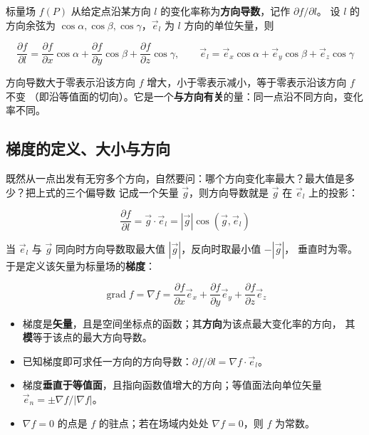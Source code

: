 标量场 $f(P)$ 从给定点沿某方向 $l$ 的变化率称为\textbf{方向导数}，记作 $\partial f/\partial l$。
设 $l$ 的方向余弦为 $\cos\alpha,\cos\beta,\cos\gamma$，$\vec{e}_l$ 为 $l$ 方向的单位矢量，则
\begin{formulaBox}
\[
\frac{\partial f}{\partial l}=\frac{\partial f}{\partial x}\cos\alpha
+\frac{\partial f}{\partial y}\cos\beta
+\frac{\partial f}{\partial z}\cos\gamma,
\qquad
\vec{e}_l=\vec{e}_x\cos\alpha+\vec{e}_y\cos\beta+\vec{e}_z\cos\gamma
\]
\end{formulaBox}

方向导数大于零表示沿该方向 $f$ 增大，小于零表示减小，等于零表示沿该方向 $f$ 不变
（即沿等值面的切向）。它是一个\textbf{与方向有关}的量：同一点沿不同方向，变化率不同。

\subsection{梯度的定义、大小与方向}

既然从一点出发有无穷多个方向，自然要问：哪个方向变化率最大？最大值是多少？把上式的三个偏导数
记成一个矢量 $\vec{g}$，则方向导数就是 $\vec{g}$ 在 $\vec{e}_l$ 上的投影：
\begin{formulaBox}
\[
\frac{\partial f}{\partial l}=\vec{g}\cdot\vec{e}_l=|\vec{g}|\cos(\vec{g},\vec{e}_l)
\]
\end{formulaBox}

当 $\vec{e}_l$ 与 $\vec{g}$ 同向时方向导数取最大值 $|\vec{g}|$，反向时取最小值 $-|\vec{g}|$，
垂直时为零。于是定义该矢量为标量场的\textbf{梯度}：
\begin{formulaBox}
\[
\operatorname{grad} f=\nabla f
=\frac{\partial f}{\partial x}\vec{e}_x+\frac{\partial f}{\partial y}\vec{e}_y+\frac{\partial f}{\partial z}\vec{e}_z
\]
\end{formulaBox}

\begin{itemize}
    \item 梯度是\textbf{矢量}，且是空间坐标点的函数；其\textbf{方向}为该点最大变化率的方向，
    其\textbf{模}等于该点的最大方向导数。
    \item 已知梯度即可求任一方向的方向导数：$\partial f/\partial l=\nabla f\cdot\vec{e}_l$。
    \item 梯度\textbf{垂直于等值面}，且指向函数值增大的方向；等值面法向单位矢量
    $\vec{e}_n=\pm\nabla f/|\nabla f|$。
    \item $\nabla f=0$ 的点是 $f$ 的驻点；若在场域内处处 $\nabla f=0$，则 $f$ 为常数。
\end{itemize}

